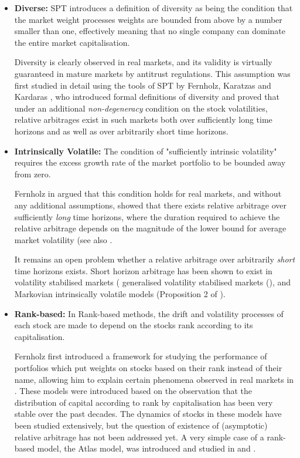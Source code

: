 \documentclass[british]{amsart} \usepackage{lmodern}
\numberwithin{equation}{section} \numberwithin{figure}{section}
\theoremstyle{plain} \newtheorem{thm}{\protect\theoremname}[section]
\theoremstyle{definition} \newtheorem{defn}[thm]{\protect\definitionname}
\theoremstyle{plain} \newtheorem{assumption}[thm]{\protect\assumptionname}
\theoremstyle{plain} \newtheorem{lem}[thm]{\protect\lemmaname}
\theoremstyle{plain} \newtheorem{prop}[thm]{\protect\propositionname}
\theoremstyle{remark} \newtheorem{rem}[thm]{\protect\remarkname}
\theoremstyle{plain} \newtheorem{cor}[thm]{\protect\corollaryname}
\begin{document}
\begin{itemize}

\item \textbf{Diverse:} SPT introduces a definition of diversity as being the
condition that the market weight processes weights are bounded from above by a
number smaller than one, effectively meaning that no single company can dominate
the entire market capitalisation.

Diversity is clearly observed in real markets, and its validity is virtually
guaranteed in mature markets by antitrust regulations. This assumption was
first studied in detail using the tools of SPT by Fernholz, Karatzas and
Kardaras \cite{fernholz2005}, who introduced formal definitions of diversity and
proved that under an additional \textit{non-degeneracy} condition on the stock
volatilities, relative arbitrages exist in such markets  both over sufficiently
long time horizons and as well as over arbitrarily short time horizons.

\item \textbf{Intrinsically Volatile:} The condition of "sufficiently intrinsic
volatility" requires the excess growth rate of the market portfolio to be
bounded away from zero.

Fernholz in \cite{fernholz2002} argued that this condition holds for real
markets, and without any additional assumptions, showed that there exists
relative arbitrage over sufficiently \textit{long} time horizons, where the
duration required to achieve the relative arbitrage depends on the magnitude of
the lower bound for average market volatility (see also
\cite{fernholz2005relative}.

It remains an open problem whether a relative arbitrage over arbitrarily
\textit{short} time horizons exists. Short horizon arbitrage  has been shown to
exist in volatility stabilised markets (\cite{banner2008short} generalised
volatility stabilised markets (\cite{pickova2014generalized}), and Markovian
intrinsically volatile models (Proposition 2 of \cite{fernholz2009}).

\item \textbf{Rank-based:} In Rank-based methods, the drift and volatility
processes of each stock are made to depend on the stocks rank according to its
capitalisation.

Fernholz first introduced a framework for studying the performance of portfolios
which put weights on stocks based on their rank instead of their name, allowing
him to explain certain phenomena observed in real markets in
\cite{fernholz2002}. These models were introduced based on the observation that
the distribution of capital according to rank by capitalisation has been very
stable over the past decades. The dynamics of stocks in these models have been
studied extensively, but the question of existence of (asymptotic) relative
arbitrage has not been addressed yet. A very simple case of a rank-based model,
the Atlas model, was introduced and studied in \cite{banner2005atlas} and
\cite{ichiba2011hybrid}.

\end{itemize}
\end{document}
